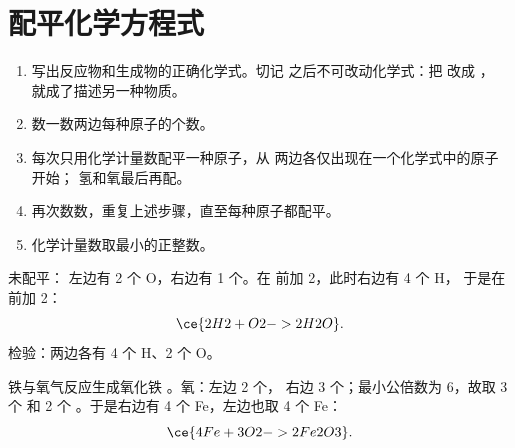 \section{配平化学方程式}

\begin{method}[配平化学方程式]\label{met:g8:balanced-equations:balance}
\begin{enumerate}
  \item 写出反应物和生成物的正确化学式。切记
        之后不可改动化学式：把  改成 ，
        就成了描述另一种物质。
  \item 数一数两边每种原子的个数。
  \item 每次只用化学计量数配平一种原子，从
        两边各仅出现在一个化学式中的原子开始；
        氢和氧最后再配。
  \item 再次数数，重复上述步骤，直至每种原子都配平。
  \item 化学计量数取最小的正整数。
\end{enumerate}
\end{method}

\begin{example}[氢和氧]\label{ex:g8:balanced-equations:water}
未配平： %
左边有 2 个 O，右边有 1 个。在  前加 2，此时右边有 4 个 H，
于是在  前加 2：
\[
  \ce{2H2 + O2 -> 2H2O}.
\]
检验：两边各有 4 个 H、2 个 O。
\end{example}

\begin{example}[铁在氧气中燃烧]\label{ex:g8:balanced-equations:iron-oxide}
铁与氧气反应生成氧化铁 。氧：左边 2 个，
右边 3 个；最小公倍数为 6，故取 3 个  和 2 个
。于是右边有 4 个 Fe，左边也取 4 个 Fe：
\[
  \ce{4Fe + 3O2 -> 2Fe2O3}.
\]
\end{example}

